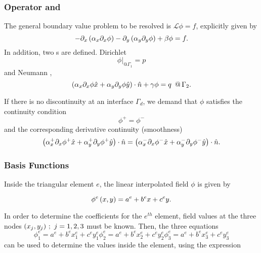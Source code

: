 \subsubsection{Operator and \bc}
\label{ssubsec:Operator and bc}
The general boundary value problem to be resolved is $\mathcal{L}\phi = f$, explicitly given by
\begin{equation}
\label{eq:Strum-Liouville 2D}
-\partial_x\left({\alpha_x\partial_x\phi}\right)
-\partial_y\left({\alpha_y\partial_y\phi}\right)
+ \beta \phi = f.
\end{equation}
In addition, two \bc s are defined. Dirichlet \bc
\begin{equation}
\label{eq:Dirichlet BC}
\left.{\phi}\right|_{@\Gamma_1} = p
\end{equation}
and Neumann \bc,
\begin{equation}
\label{eq:Neumann BC}
\left({
	\alpha_x \partial_x\phi \hat{x}
	+
	\alpha_y \partial_y\phi \hat{y}
	}\right)\cdot \hat{n}
+ \gamma\phi = q \,\,\, @ \,\Gamma_2.
\end{equation}

If there is no discontinuity at an interface $\Gamma_d$, we demand that $\phi$ satisfies the continuity condition
\begin{equation}
\label{eq:Cont BC}
\phi^+ = \phi^- 
\end{equation}
and the corresponding derivative continuity (smoothness)
\begin{equation}
\label{eq:Smoothness BC}
\left({
	\alpha_x^+ \partial_x\phi^+\hat{x}
	+
	\alpha_y^+ \partial_y\phi^+\hat{y}
}\right)\cdot\hat{n}
=
\left({
	\alpha_x^- \partial_x\phi^-\hat{x}
	+
	\alpha_y^- \partial_y\phi^-\hat{y}
}\right)\cdot\hat{n}.
\end{equation}

\subsubsection{Basis Functions}
\label{ssubsec:Basis functins}

Inside the triangular element $e$, the linear interpolated field $\phi$ is given by

\begin{equation}
\label{eq:Field 1st order interp}
\phi^e \left({x,y}\right) = 
a^e + b^e x + c^e y.
\end{equation}

In order to determine the coefficients for the $e^{th}$ element, field values at the three nodes $\left({x_j,y_j}\right)\,;\,\,j=1,2,3$ must be known. Then, the three equations
\begin{subequations}
\label{eq:Linear interp coeff eq system}
\begin{equation}
\phi_1^e = a^e + b^e x_1^e + c^e y_1^e
\end{equation}
\begin{equation}
\phi_2^e = a^e + b^e x_2^e + c^e y_2^e 
\end{equation}
\begin{equation}
\phi_3^e = a^e + b^e x_3^e + c^e y_3^e
\end{equation}
\end{subequations}
can be used to determine the values inside the element, using the expression

